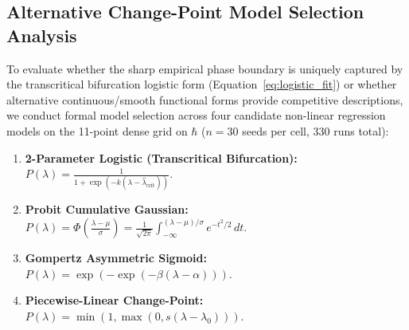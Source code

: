 \documentclass{article}
\theoremstyle{plain}
\theoremstyle{definition}
\begin{document}
\subsection{Alternative Change-Point Model Selection Analysis}
\label{sec:app_model_selection}
To evaluate whether the sharp empirical phase boundary is uniquely captured by the transcritical bifurcation logistic form (Equation~\eqref{eq:logistic_fit}) or whether alternative continuous/smooth functional forms provide competitive descriptions, we conduct formal model selection across four candidate non-linear regression models on the 11-point dense grid on $\hbar$ ($n=30$ seeds per cell, 330 runs total):
\begin{enumerate}[leftmargin=*,noitemsep]
    \item \textbf{2-Parameter Logistic (Transcritical Bifurcation):} $P(\lambda) = \frac{1}{1 + \exp(-k(\lambda - \hat{\lambda}_{\text{crit}}))}$.
    \item \textbf{Probit Cumulative Gaussian:} $P(\lambda) = \Phi\left(\frac{\lambda - \mu}{\sigma}\right) = \frac{1}{\sqrt{2\pi}} \int_{-\infty}^{(\lambda - \mu)/\sigma} e^{-t^2/2} \, dt$.
    \item \textbf{Gompertz Asymmetric Sigmoid:} $P(\lambda) = \exp\left(-\exp(-\beta(\lambda - \alpha))\right)$.
    \item \textbf{Piecewise-Linear Change-Point:} $P(\lambda) = \min\left(1, \max\left(0, s(\lambda - \lambda_0)\right)\right)$.
\end{enumerate}
\end{document}
